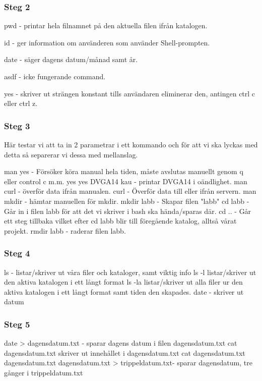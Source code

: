 \documentclass[12pt, a4paper, openright]{article}
\begin{document}
\subsubsection{Steg 2}

pwd - printar hela filnamnet på den aktuella filen ifrån katalogen.
\noindent

id - ger information om använderen som använder Shell-prompten.
\noindent


date - säger dagens datum/månad samt år.
\noindent

asdf - icke fungerande command.
\noindent

yes - skriver ut strängen konstant tills användaren eliminerar den, antingen ctrl c eller ctrl z.

\noindent

\subsubsection{Steg 3}
Här testar vi att ta in 2 parametrar i ett kommando och för att vi ska lyckas med detta så separerar vi dessa med mellanslag. 


man yes - Försöker köra manual hela tiden, måste avslutas manuellt genom q eller control c m.m.
yes  yes DVGA14 kau - printar DVGA14 i oändlighet.
man curl - överför data ifrån manualen. 
curl - Överför data till eller ifrån servern.
man mkdir - hämtar manuellen för mkdir. 
mkdir labb - Skapar filen "labb"
cd labb - Går in i filen labb för att det vi skriver i bash ska hända/sparas där.
cd .. - Går ett steg tillbaka vilket efter cd labb blir till föregående katalog, alltså vårat projekt.
rmdir labb - raderar filen labb.

\subsubsection{Steg 4}

ls - listar/skriver ut våra filer och kataloger, samt viktig info
ls -l listar/skriver ut den aktiva katalogen i ett långt format
ls -la listar/skriver ut alla filer ur den aktiva katalogen i ett långt format samt tiden den skapades.
date - skriver ut datum

\subsubsection{Steg 5}

date > dagensdatum.txt - sparar dagens datum i filen dagensdatum.txt
cat dagensdatum.txt skriver ut innehållet i dagensdatum.txt
cat dagensdatum.txt dagensdatum.txt dagensdatum.txt > trippeldatum.txt- sparar dagensdatum, tre gånger i trippeldatum.txt
\end{document}
